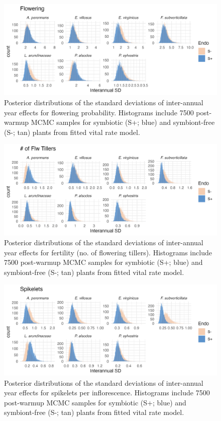 \documentclass[9pt,twoside,lineno]{pnas-new}
\begin{document}
\newpage
\begin{figure}
	\centering
	\includegraphics[width=.9\linewidth]{flow_sigmayear_hist.png}
	\caption{Posterior distributions of the standard deviations of inter-annual year effects for flowering probability. Histograms include 7500 post-warmup MCMC samples for symbiotic (S+; blue) and symbiont-free (S-; tan) plants from fitted vital rate model.}
\end{figure}

\newpage
\begin{figure}
	\centering
	\includegraphics[width=.9\linewidth]{fert_sigmayear_hist.png}
	\caption{Posterior distributions of the standard deviations of inter-annual year effects for fertility (no. of flowering tillers). Histograms include 7500 post-warmup MCMC samples for symbiotic (S+; blue) and symbiont-free (S-; tan) plants from fitted vital rate model.}
\end{figure}

\newpage
\begin{figure}
	\centering
	\includegraphics[width=.9\linewidth]{spike_sigmayear_hist.png}
	\caption{Posterior distributions of the standard deviations of inter-annual year effects for spikelets per inflorescence. Histograms include 7500 post-warmup MCMC samples for symbiotic (S+; blue) and symbiont-free (S-; tan) plants from fitted vital rate model.}
\end{figure}
\newpage
\end{document}
